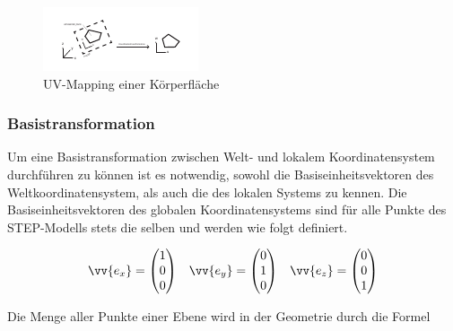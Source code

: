 \begin{figure}[h]
	\centering
	
	\includegraphics[width=0.7\linewidth]{img/uvwmapping.pdf}
	
	\caption{UV-Mapping einer Körperfläche}
	\label{fig:uvwmapping}
	
\end{figure}
 
\subsubsection{Basistransformation}

Um eine Basistransformation zwischen Welt- und lokalem Koordinatensystem durchführen zu können ist es notwendig, sowohl die Basiseinheitsvektoren des Weltkoordinatensystem, als auch die des lokalen Systems zu kennen. Die Basiseinheitsvektoren des globalen Koordinatensystems sind für alle Punkte des STEP-Modells stets die selben und werden wie folgt definiert.

\begin{singlespace}
	\begin{equation}
	\begin{aligned}
	\vv{e_{x}}=\begin{pmatrix}
	1 \\ 
	0 \\ 
	0
	\end{pmatrix}  
	&& 
	\vv{e_{y}}=\begin{pmatrix}
	0 \\ 
	1 \\ 
	0
	\end{pmatrix}  
	&& 
	\vv{e_{z}}=\begin{pmatrix}
	0 \\ 
	0 \\ 
	1
	\end{pmatrix} 
	\end{aligned}
	\end{equation}
\end{singlespace}

Die Menge aller Punkte einer Ebene wird in der Geometrie durch die Formel

